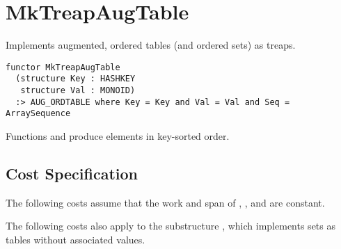 \chapter{MkTreapAugTable}
\label{ch:treap-aug-table}

\begin{cluster}
\label{grp:grm:treap-aug-table::implements}

\begin{gram}
\label{grm:treap-aug-table::implements}
\label{ch:treap-aug-table}
\begin{preamble}
Implements augmented, ordered tables (and ordered sets) as treaps.
\begin{verbatim}
functor MkTreapAugTable
  (structure Key : HASHKEY
   structure Val : MONOID)
  :> AUG_ORDTABLE where Key = Key and Val = Val and Seq = ArraySequence
\end{verbatim}
\end{preamble}

\end{gram}
\end{cluster}

\begin{cluster}
\label{grp:grm:treap-aug-table::implementation-defined-behavior}

\begin{gram}
\label{grm:treap-aug-table::implementation-defined-behavior}
Functions  and  produce elements in key-sorted order.

\end{gram}
\end{cluster}


\section{Cost Specification}
\label{sec:treap-aug-table::cost-specification}

\begin{cluster}
\label{grp:grm:treap-aug-table::costs}

\begin{gram}
\label{grm:treap-aug-table::costs}
The following costs assume that the work and span of ,
, and  are constant.

\end{gram}
\end{cluster}

\begin{cluster}
\label{grp:grm:treap-aug-table::apply}

\begin{gram}
\label{grm:treap-aug-table::apply}
The following costs also apply to the substructure , which implements
sets as tables without associated values.

\end{gram}
\end{cluster}

